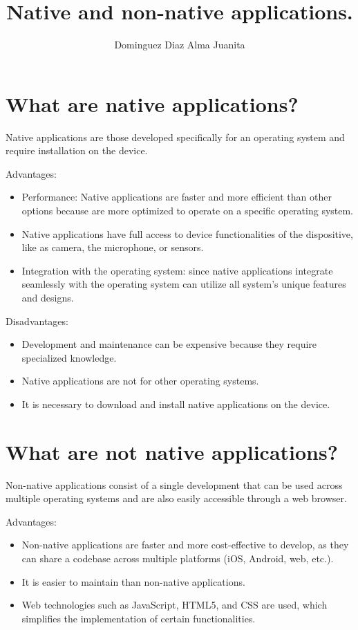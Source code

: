 \documentclass[12pt,a4paper]{article}
\author{Dominguez Diaz Alma Juanita}
\title{Native and non-native applications.}
\begin{document}
\maketitle 
\section*{What are native applications?}
\justify
Native applications are those developed specifically for an operating system and require installation on the device.

Advantages:
\begin{itemize}
\item Performance: Native applications are faster and more efficient than other options because are more optimized to operate on a specific operating system.
\item Native applications have full access to device functionalities of the dispositive, like as camera, the microphone, or sensors.
\item Integration with the operating system: since native applications integrate seamlessly with the operating system can utilize all system's unique features and designs.
\end{itemize}

\justify Disadvantages:

\begin{itemize}
\item Development and maintenance can be expensive because they require specialized knowledge.

\item Native applications are not for other operating systems. 

\item It is necessary to download and install native applications on the device.
\end{itemize}

\section{What are not native applications?}
\justify Non-native applications consist of a single development that can be used across multiple operating systems and are also easily accessible through a web browser.

Advantages: 
\begin{itemize}
\item Non-native applications are faster and more cost-effective to develop, as they can share a codebase across multiple platforms (iOS, Android, web, etc.).

\item It is easier to maintain than non-native applications.

\item Web technologies such as JavaScript, HTML5, and CSS are used, which simplifies the implementation of certain functionalities.
\end{itemize}
\end{document}
